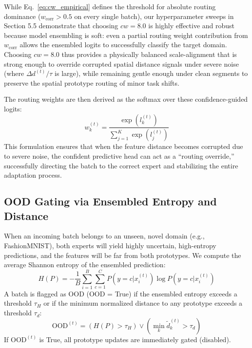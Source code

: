 \documentclass{article}
\theoremstyle{plain}
\theoremstyle{definition}
\theoremstyle{remark}
\begin{document}
While Eq.~\eqref{eq:cw_empirical} defines the threshold for absolute routing dominance ($w_{\text{corr}} > 0.5$ on every single batch), our hyperparameter sweeps in Section 5.5 demonstrate that choosing $cw = 8.0$ is highly effective and robust because model ensembling is soft: even a partial routing weight contribution from $w_{\text{corr}}$ allows the ensembled logits to successfully classify the target domain. Choosing $cw = 8.0$ thus provides a physically balanced scale-alignment that is strong enough to override corrupted spatial distance signals under severe noise (where $\Delta d^{(t)} / \tau$ is large), while remaining gentle enough under clean segments to preserve the spatial prototype routing of minor task shifts.

The routing weights are then derived as the softmax over these confidence-guided logits:
\begin{equation}
    w_k^{(t)} = \frac{\exp(l_k^{(t)})}{\sum_{j=1}^K \exp(l_j^{(t)})}
\end{equation}
This formulation ensures that when the feature distance becomes corrupted due to severe noise, the confident predictive head can act as a ``routing override,'' successfully directing the batch to the correct expert and stabilizing the entire adaptation process.

\subsection{OOD Gating via Ensembled Entropy and Distance}
When an incoming batch belongs to an unseen, novel domain (e.g., FashionMNIST), both experts will yield highly uncertain, high-entropy predictions, and the features will be far from both prototypes. We compute the average Shannon entropy of the ensembled prediction:
\begin{equation}
    H(P) = -\frac{1}{B} \sum_{i=1}^B \sum_{c=1}^C P(y=c|x_i^{(t)}) \log P(y=c|x_i^{(t)})
\end{equation}
A batch is flagged as OOD (OOD = True) if the ensembled entropy exceeds a threshold $\tau_H$ or if the minimum normalized distance to any prototype exceeds a threshold $\tau_d$:
\begin{equation}
    \text{OOD}^{(t)} = (H(P) > \tau_H) \lor \left( \min_k \tilde{d}_k^{(t)} > \tau_d \right)
\end{equation}
If $\text{OOD}^{(t)}$ is True, all prototype updates are immediately gated (disabled).
\end{document}
